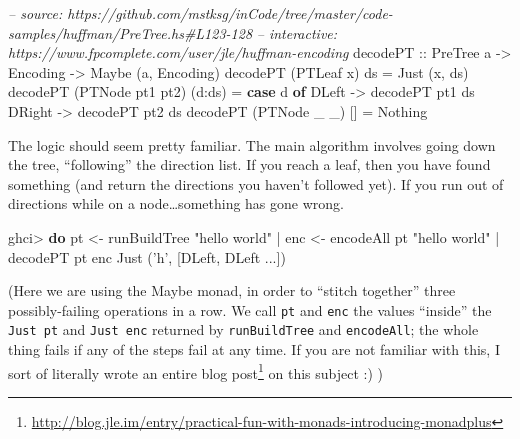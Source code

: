 \documentclass[]{article}
\newenvironment{Shaded}{\begin{snugshade}}{\end{snugshade}}
\newcommand{\CharTok}[1]{\textcolor[rgb]{0.31,0.60,0.02}{#1}}
\newcommand{\CommentTok}[1]{\textcolor[rgb]{0.56,0.35,0.01}{\textit{#1}}}
\newcommand{\DataTypeTok}[1]{\textcolor[rgb]{0.13,0.29,0.53}{#1}}
\newcommand{\FunctionTok}[1]{\textcolor[rgb]{0.00,0.00,0.00}{#1}}
\newcommand{\KeywordTok}[1]{\textcolor[rgb]{0.13,0.29,0.53}{\textbf{#1}}}
\newcommand{\NormalTok}[1]{#1}
\newcommand{\OtherTok}[1]{\textcolor[rgb]{0.56,0.35,0.01}{#1}}
\newcommand{\StringTok}[1]{\textcolor[rgb]{0.31,0.60,0.02}{#1}}
\renewcommand{\href}[2]{#2\footnote{\url{#1}}}
\begin{document}
\begin{Shaded}
\begin{Highlighting}[]
\CommentTok{-- source: https://github.com/mstksg/inCode/tree/master/code-samples/huffman/PreTree.hs#L123-128}
\CommentTok{-- interactive: https://www.fpcomplete.com/user/jle/huffman-encoding}
\OtherTok{decodePT ::} \DataTypeTok{PreTree}\NormalTok{ a }\OtherTok{->} \DataTypeTok{Encoding} \OtherTok{->} \DataTypeTok{Maybe}\NormalTok{ (a, }\DataTypeTok{Encoding}\NormalTok{)}
\NormalTok{decodePT (}\DataTypeTok{PTLeaf}\NormalTok{ x)       ds     }\FunctionTok{=} \DataTypeTok{Just}\NormalTok{ (x, ds)}
\NormalTok{decodePT (}\DataTypeTok{PTNode}\NormalTok{ pt1 pt2) (d}\FunctionTok{:}\NormalTok{ds) }\FunctionTok{=} \KeywordTok{case}\NormalTok{ d }\KeywordTok{of}
                                     \DataTypeTok{DLeft}  \OtherTok{->}\NormalTok{ decodePT pt1 ds}
                                     \DataTypeTok{DRight} \OtherTok{->}\NormalTok{ decodePT pt2 ds}
\NormalTok{decodePT (}\DataTypeTok{PTNode}\NormalTok{ _ _)     []     }\FunctionTok{=} \DataTypeTok{Nothing}
\end{Highlighting}
\end{Shaded}

The logic should seem pretty familiar. The main algorithm involves going down
the tree, ``following'' the direction list. If you reach a leaf, then you have
found something (and return the directions you haven't followed yet). If you run
out of directions while on a node\ldots{}something has gone wrong.

\begin{Shaded}
\begin{Highlighting}[]
\NormalTok{ghci}\FunctionTok{>} \KeywordTok{do}\NormalTok{  pt  }\OtherTok{<-}\NormalTok{ runBuildTree }\StringTok{"hello world"}
    \FunctionTok{|}\NormalTok{     enc }\OtherTok{<-}\NormalTok{ encodeAll pt }\StringTok{"hello world"}
    \FunctionTok{|}\NormalTok{     decodePT pt enc}
\DataTypeTok{Just}\NormalTok{ (}\CharTok{'h'}\NormalTok{, [}\DataTypeTok{DLeft}\NormalTok{, }\DataTypeTok{DLeft} \FunctionTok{...}\NormalTok{])}
\end{Highlighting}
\end{Shaded}

(Here we are using the Maybe monad, in order to ``stitch together'' three
possibly-failing operations in a row. We call \texttt{pt} and \texttt{enc} the
values ``inside'' the \texttt{Just\ pt} and \texttt{Just\ enc} returned by
\texttt{runBuildTree} and \texttt{encodeAll}; the whole thing fails if any of
the steps fail at any time. If you are not familiar with this,
\href{http://blog.jle.im/entry/practical-fun-with-monads-introducing-monadplus}{I
sort of literally wrote an entire blog post} on this subject :) )
\end{document}
